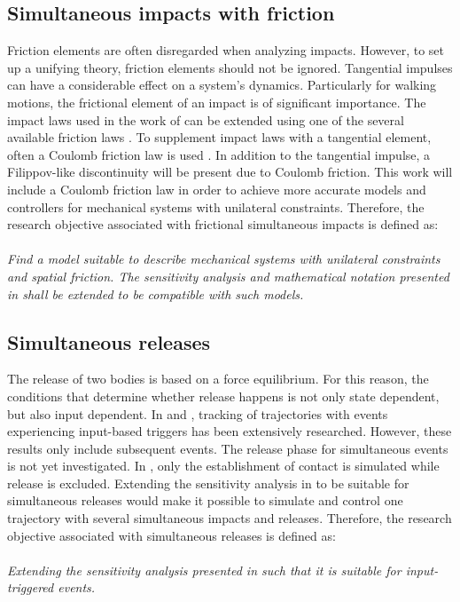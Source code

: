 \documentclass[../DC2017114Bouma.tex]{subfiles}
\begin{document}
\subsection*{Simultaneous impacts with friction}
Friction elements are often disregarded when analyzing impacts. However, to set up a unifying theory, friction elements should not be ignored. Tangential impulses can have a considerable effect on a system's dynamics. Particularly for walking motions, the frictional element of an impact is of significant importance. The impact laws used in the work of \cite{Chen2018a} can be extended using one of the several available friction laws \cite{Leine2008}. To supplement impact laws with a tangential element, often a Coulomb friction law is used \cite{Glocker2014a}. In addition to the tangential impulse, a Filippov-like discontinuity will be present due to Coulomb friction. This work will include a Coulomb friction law in order to achieve more accurate models and controllers for mechanical systems with unilateral constraints. Therefore, the research objective associated with frictional simultaneous impacts is defined as:\\\\
\textit{Find a model suitable to describe mechanical systems with unilateral constraints and spatial friction. The sensitivity analysis and mathematical notation presented in \cite{Rijnen2018a} shall be extended to be compatible with such models.}

\subsection*{Simultaneous releases}
The release of two bodies is based on a force equilibrium. For this reason, the conditions that determine whether release happens is not only state dependent, but also input dependent. In \cite{Rijnen2016} and \cite{Rijn2016}, tracking of trajectories with events experiencing input-based triggers has been extensively researched. However, these results only include subsequent events. The release phase for simultaneous events is not yet investigated. In \cite{Chen2018a}, only the establishment of contact is simulated while release is excluded. Extending the sensitivity analysis in \cite{Chen2018a} to be suitable for simultaneous releases would make it possible to simulate and control one trajectory with several simultaneous impacts and releases. Therefore, the research objective associated with simultaneous releases is defined as:\\\\
\textit{Extending the sensitivity analysis presented in \cite{Rijnen2018a} such that it is suitable for input-triggered events.}
\end{document}
